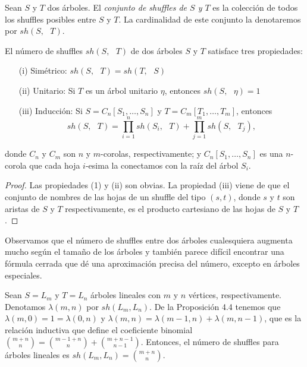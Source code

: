 \documentclass[../main.tex]{subfiles}
\begin{document}
\begin{defi}
    Sean $S$ y $T$ dos \'arboles. El \emph{conjunto de shuffles de $S$ y $T$} es la colecci\'on de todos los shuffles posibles entre $S$ y $T$. La cardinalidad de este conjunto la denotaremos por $sh(S,\text{ }T)$.
\end{defi}
\begin{prop}
    El n\'umero de shuffles $sh(S,\text{ }T)$ de dos \'arboles $S$ y $T$ satisface tres propiedades:
    \begin{enumerate}
        \item[{\rm (i)}] Sim\'etrico: $sh(S, \text{ }T) = sh(T, \text{ }S)$
        \item[{\rm (ii)}] Unitario: Si $T$ es un \'arbol unitario $\eta$, entonces $sh(S, \text{ }\eta)=1$
        \item[{\rm (iii)}] Inducci\'on: Si $S=C_n[S_1,\dots,S_n]$ y $T=C_m[T_1,\dots,T_m]$, entonces
              $$
                  sh(S, \text{ }T)  = \prod_{i=1}^n sh(S_i, \text{ }T) + \prod_{j=1}^m sh(S, \text{ }T_j),
              $$
    \end{enumerate}
    donde $C_n$ y $C_m$ son $n$ y $m$-corolas, respectivamente; y $C_n[S_1,\dots,S_n]$ es una $n$-corola que cada hoja $i$-esima la conectamos con la ra\'iz del \'arbol $S_i$.
\end{prop}
\begin{proof}
    Las propiedades (1) y (ii) son obvias. La propiedad (iii) viene de que el conjunto de nombres de las hojas de un shuffle del tipo $(s, t)$, donde $s$ y $t$ son aristas de $S$ y $T$ respectivamente, es el producto cartesiano de las hojas de $S$ y $T$.
\end{proof}

Observamos que el n\'umero de shuffles entre dos \'arboles cualesquiera augmenta mucho seg\'un el tama\~no de los \'arboles y tambi\'en parece dif\'icil encontrar una f\'ormula cerrada que d\'e una aproximaci\'on precisa del n\'umero, excepto en \'arboles especiales.

Sean $S=L_m$ y $T=L_n$ \'arboles lineales con $m$ y $n$ v\'ertices, respectivamente. Denotamos $\lambda(m,n)$ por $sh(L_m, L_n)$. De la Proposici\'on 4.4 tenemos que $\lambda(m,0) = 1 = \lambda(0,n)$ y $\lambda(m,n) = \lambda(m-1,n) + \lambda(m,n-1)$, que es la relaci\'on inductiva que define el coeficiente binomial $\binom{m+n}{n} = \binom{m-1+n}{n} + \binom{m+n-1}{n-1}$. Entonces, el n\'umero de shuffles para \'arboles lineales es $sh(L_m, L_n) = \binom{m+n}{n}$.
\end{document}
